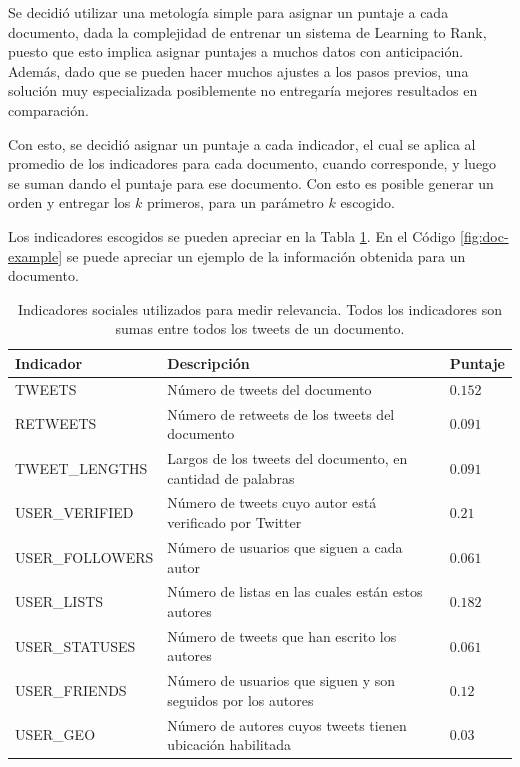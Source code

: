     Se decidió utilizar una metología simple para asignar un puntaje a
    cada documento, dada la complejidad de entrenar un sistema de
    Learning to Rank, puesto que esto implica asignar puntajes a muchos datos con
    anticipación. Además, dado que se pueden hacer muchos ajustes a los
    pasos previos, una solución muy especializada posiblemente no
    entregaría mejores resultados en comparación.

    Con esto, se decidió asignar un puntaje a cada indicador, el cual se aplica
    al promedio de los indicadores para cada documento, cuando
    corresponde, y luego se suman dando el puntaje para ese
    documento. Con esto es posible generar un orden y entregar los $k$
    primeros, para un parámetro $k$ escogido.

    Los indicadores escogidos se pueden apreciar en la Tabla
    \ref{tbl:indicadores}. En el Código \ref{fig:doc-example} se puede
    apreciar un ejemplo de la información obtenida para un documento.




\begin{table}[htb]
\begin{center}
\begin{tabular}{|l|l|l|}
\hline
 Indicador        &  Descripción                                                   &  Puntaje  \\
\hline
\hline
 TWEETS           &  Número de tweets del documento                                &  $0.152$  \\
 RETWEETS         &  Número de retweets de los tweets del documento                &  $0.091$  \\
 TWEET\_LENGTHS   &  Largos de los tweets del documento, en cantidad de palabras   &  $0.091$  \\
 USER\_VERIFIED   &  Número de tweets cuyo autor está verificado por Twitter       &  $0.21$   \\
 USER\_FOLLOWERS  &  Número de usuarios que siguen a cada autor                    &  $0.061$  \\
 USER\_LISTS      &  Número de listas en las cuales están estos autores            &  $0.182$  \\
 USER\_STATUSES   &  Número de tweets que han escrito los autores                  &  $0.061$  \\
 USER\_FRIENDS    &  Número de usuarios que siguen y son seguidos por los autores  &  $0.12$   \\
 USER\_GEO        &  Número de autores cuyos tweets tienen ubicación habilitada    &  $0.03$   \\
\hline
\end{tabular}
\end{center}
\caption{\label{tbl:indicadores}Indicadores sociales utilizados para medir relevancia. Todos los indicadores son sumas entre todos los tweets de un documento.}
\end{table}

